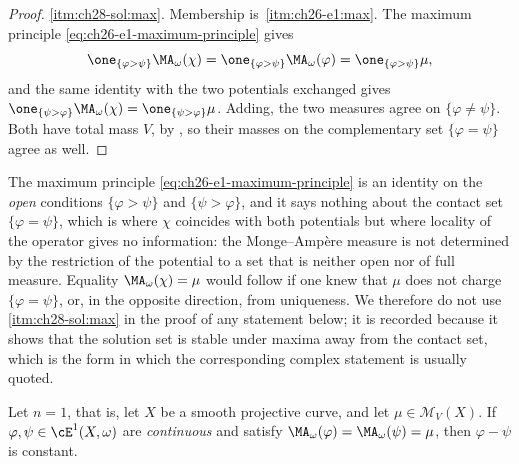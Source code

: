 \begin{proof}
\cref{itm:ch28-sol:max}.  Membership is
\,\cref{itm:ch26-e1:max}.  The maximum principle
\eqref{eq:ch26-e1-maximum-principle} gives
\[
 \one_{\{\varphi>\psi\}}\MA_\omega(\chi)
 =\one_{\{\varphi>\psi\}}\MA_\omega(\varphi)
 =\one_{\{\varphi>\psi\}}\mu ,
\]
and the same identity with the two potentials exchanged gives
\(\one_{\{\psi>\varphi\}}\MA_\omega(\chi)
=\one_{\{\psi>\varphi\}}\mu\).  Adding, the two measures agree on
\(\{\varphi\neq\psi\}\).  Both have total mass \(V\), by
, so their masses on the complementary set
\(\{\varphi=\psi\}\) agree as well.
\end{proof}

\begin{remark}
\label{rem:ch28-max-on-contact}
The maximum principle \eqref{eq:ch26-e1-maximum-principle} is an identity on
the \emph{open} conditions \(\{\varphi>\psi\}\) and \(\{\psi>\varphi\}\), and
it says nothing about the contact set \(\{\varphi=\psi\}\), which is where
\(\chi\) coincides with both potentials but where locality of the operator
gives no information: the Monge--Amp\`ere measure is not determined by the
restriction of the potential to a set that is neither open nor of full
measure.  Equality \(\MA_\omega(\chi)=\mu\) would follow if one knew that
\(\mu\) does not charge \(\{\varphi=\psi\}\), or, in the opposite direction,
from uniqueness.  We therefore do not use \cref{itm:ch28-sol:max} in the proof
of any statement below; it is recorded because it shows that the solution set
is stable under maxima away from the contact set, which is the form in which
the corresponding complex statement is usually quoted.
\end{remark}

\begin{proposition}
\label{prop:ch28-curve-uniqueness}
Let \(n=1\), that is, let \(X\) be a smooth projective curve, and let
\(\mu\in\mathcal M_V(X)\).  If \(\varphi,\psi\in\cE^1(X,\omega)\) are
\emph{continuous} and satisfy
\(\MA_\omega(\varphi)=\MA_\omega(\psi)=\mu\), then \(\varphi-\psi\) is
constant.
\end{proposition}

